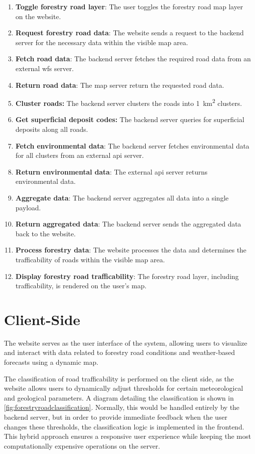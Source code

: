 \begin{enumerate}
    \item \textbf{Toggle forestry road layer}: The user toggles the forestry road map layer on the website.
    \item \textbf{Request forestry road data}: The website sends a request to the backend server for the necessary data within the visible map area.
    \item \textbf{Fetch road data}: The backend server fetches the required road data from an external \gls{wfs} server.
    \item \textbf{Return road data}: The map server return the requested road data.
    \item \textbf{Cluster roads:} The backend server clusters the roads into \qty{1}{\kilo\meter\squared} clusters.
    \item \textbf{Get superficial deposit codes:} The backend server queries for superficial deposits along all roads.
    \item \textbf{Fetch environmental data}: The backend server fetches environmental data for all clusters from an external \acrshort{api} server.
    \item \textbf{Return environmental data}: The external \acrshort{api} server returns environmental data.
    \item \textbf{Aggregate data}: The backend server aggregates all data into a single payload.
    \item \textbf{Return aggregated data}: The backend server sends the aggregated data back to the website.
    \item \textbf{Process forestry data}: The website processes the data and determines the trafficability of roads within the visible map area.
    \item \textbf{Display forestry road trafficability}: The forestry road layer, including trafficability, is rendered on the user's map.
\end{enumerate}

\section{Client-Side}\label{sec:technicaldesign:website}

The website serves as the user interface of the system, allowing users to visualize and interact with data related to forestry road conditions and weather-based forecasts using a dynamic map.

The classification of road trafficability is performed on the client side, as the website allows users to dynamically adjust thresholds for certain meteorological and geological parameters. A diagram detailing the classification is shown in \autoref{fig:forestryroadclassification}. Normally, this would be handled entirely by the backend server, but in order to provide immediate feedback when the user changes these thresholds, the classification logic is implemented in the frontend. This hybrid approach ensures a responsive user experience while keeping the most computationally expensive operations on the server.

